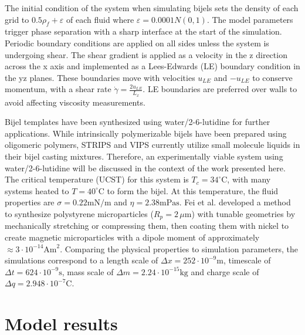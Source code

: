 The initial condition of the system when simulating bijels sets the density of each grid to $0.5\rho_f + \varepsilon$ of 
each fluid where $\varepsilon = 0.0001N(0,1)$. The model parameters trigger phase separation with a sharp interface at 
the start of the simulation. Periodic boundary conditions are applied on all sides unless the system is undergoing shear. 
The shear gradient is applied as a velocity in the z direction across the x axis and implemented as a Lees-Edwards 
(LE) boundary condition in the yz planes. \cite{wagner_leesedwards_2002, lorenz_lees-edwards_2009, yang_capillary_2022} 
These boundaries move with velocities $u_{LE}$ and $-u_{LE}$ to conserve momentum, with a shear rate 
$\dot{\gamma} = \frac{2 u_{LE}}{L_x}$. LE boundaries are preferred over walls to avoid affecting viscosity measurements. 
\cite{wagner_leesedwards_2002, lorenz_lees-edwards_2009, yang_capillary_2022}

Bijel templates have been synthesized using water/2-6-lutidine for further applications. \cite{lee_making_2013} 
While intrinsically polymerizable bijels have been prepared using oligomeric polymers, STRIPS and VIPS currently 
utilize small molecule liquids in their bijel casting mixtures. Therefore, an experimentally viable system using 
water/2-6-lutidine will be discussed in the context of the work presented here. The critical temperature (UCST) 
for this system is $T_c = 34 ^{\circ}\text{C}$, with many systems heated to $T = 40^{\circ}\text{C}$ to form the bijel. At this 
temperature, the fluid properties are $\sigma = 0.22 \text{mN/m}$ and $\eta = 2.38 \text{mPas}$. \cite{grattoni_lower_1993} 
Fei et al. developed a method to synthesize polystyrene microparticles ($R_p = 2\,\mu\text{m}$) with tunable geometries 
by mechanically stretching or compressing them, then coating them with nickel to create magnetic microparticles with 
a dipole moment of approximately$\approx 3 \cdot 10^{-14} \text{Am}^2$. \cite{fei_active_2017, fei_magneto-capillary_2020} 
Comparing the physical properties to simulation parameters, the simulations correspond to a length scale of
$\Delta x = 252 \cdot 10^{-9} \text{m}$, timescale of $\Delta t = 624 \cdot 10^{-9} \text{s}$, 
mass scale of $\Delta m = 2.24 \cdot 10^{-15} \text{kg}$ and charge scale of $\Delta q = 2.948 \cdot 10^{-7} \text{C}$. 

\section{Model results}
\label{section:model_results}

